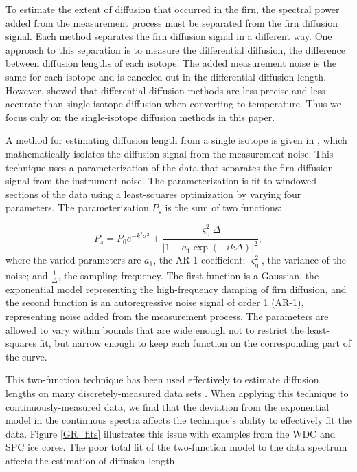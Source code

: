 \documentclass[draft, jgrga]{AGUTeX}
\begin{document}
\begin{article}
To estimate the extent of diffusion that occurred in the firn, the spectral power added from the measurement process must be separated from the firn diffusion signal. Each method separates the firn diffusion signal in a different way. One approach to this separation is to measure the differential diffusion, the difference between diffusion lengths of each isotope. The added measurement noise is the same for each isotope and is canceled out in the differential diffusion length. However, \citet{Holme2017} showed that differential diffusion methods are less precise and less accurate than single-isotope diffusion when converting to temperature. Thus we focus only on the single-isotope diffusion methods in this paper.

A method for estimating diffusion length from a single isotope is given in \citet{Gkinis2014}, which mathematically isolates the diffusion signal from the measurement noise. This technique uses a parameterization of the data that separates the firn diffusion signal from the instrument noise. The parameterization is fit to windowed sections of the data using a least-squares optimization by varying four parameters. The parameterization $P_s$ is the sum of two functions:

\begin{equation}
P_s =    P_0 {e}^{-k^2 \sigma^2} + \frac{\varsigma_{\mathrm{\eta}}^2 \Delta}
{\left| 1-a_1 \exp{\left( -i k  \Delta \right) } \right|^2},
\label{eq:powerspectrum}
\end{equation}
where the varied parameters are $a_1$, the AR-1 coefficient; $\varsigma_{\mathrm{\eta}}^2$, the variance of the noise; and $\frac{1}{\Delta}$, the sampling frequency. The first function is a Gaussian, the exponential model representing the high-frequency damping of firn diffusion, and the second function is an autoregressive noise signal of order 1 (AR-1), representing noise added from the measurement process. The parameters are allowed to vary within bounds that are wide enough not to restrict the least-squares fit, but narrow enough to keep each function on the corresponding part of the curve.

This two-function technique has been used effectively to estimate diffusion lengths on many discretely-measured data sets \citep{Gkinis2014,Holme2017}. When applying this technique to continuously-measured data, we find that the deviation from the exponential model in the continuous spectra affects the technique's ability to effectively fit the data. Figure \ref{GR_fits} illustrates this issue with examples from the WDC and SPC ice cores. The poor total fit of the two-function model to the data spectrum affects the estimation of diffusion length.


\end{article}
\end{document}
